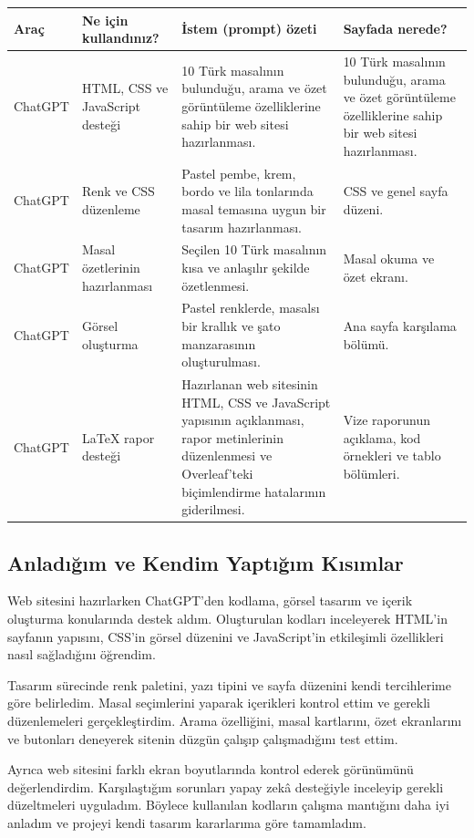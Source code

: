 \documentclass[12pt,a4paper]{article}
\begin{document}
\begin{longtable}{@{}p{2.6cm}p{3.6cm}p{4.2cm}p{3.4cm}@{}}
\toprule
\textbf {Araç} & \textbf{Ne için kullandınız?} & \textbf{İstem (prompt) özeti} & \textbf{Sayfada nerede?} \\
\midrule
\endhead
\relax ChatGPT & HTML, CSS ve JavaScript desteği & 10 Türk masalının bulunduğu, arama ve özet görüntüleme özelliklerine sahip bir web sitesi hazırlanması. & 10 Türk masalının bulunduğu, arama ve özet görüntüleme özelliklerine sahip bir web sitesi hazırlanması. \\
\relax ChatGPT & Renk ve CSS düzenleme & Pastel pembe, krem, bordo ve lila tonlarında masal temasına uygun bir tasarım hazırlanması. & CSS ve genel sayfa düzeni. \\
\relax ChatGPT & Masal özetlerinin hazırlanması & Seçilen 10 Türk masalının kısa ve anlaşılır şekilde özetlenmesi. & Masal okuma ve özet ekranı. \\
\relax ChatGPT & Görsel oluşturma & Pastel renklerde, masalsı bir krallık ve şato manzarasının oluşturulması. & Ana sayfa karşılama bölümü. \\
\relax ChatGPT & LaTeX rapor desteği & Hazırlanan web sitesinin HTML, CSS ve JavaScript yapısının açıklanması, rapor metinlerinin düzenlenmesi ve Overleaf'teki biçimlendirme hatalarının giderilmesi. & Vize raporunun açıklama, kod örnekleri ve tablo bölümleri. \\
\bottomrule
\end{longtable}

\subsection{Anladığım ve Kendim Yaptığım Kısımlar}
Web sitesini hazırlarken ChatGPT'den kodlama, görsel tasarım ve içerik oluşturma konularında destek aldım. Oluşturulan kodları inceleyerek HTML'in sayfanın yapısını, CSS'in görsel düzenini ve JavaScript'in etkileşimli özellikleri nasıl sağladığını öğrendim.

Tasarım sürecinde renk paletini, yazı tipini ve sayfa düzenini kendi tercihlerime göre belirledim. Masal seçimlerini yaparak içerikleri kontrol ettim ve gerekli düzenlemeleri gerçekleştirdim. Arama özelliğini, masal kartlarını, özet ekranlarını ve butonları deneyerek sitenin düzgün çalışıp çalışmadığını test ettim.

Ayrıca web sitesini farklı ekran boyutlarında kontrol ederek görünümünü değerlendirdim. Karşılaştığım sorunları yapay zekâ desteğiyle inceleyip gerekli düzeltmeleri uyguladım. Böylece kullanılan kodların çalışma mantığını daha iyi anladım ve projeyi kendi tasarım kararlarıma göre tamamladım.
\end{document}
